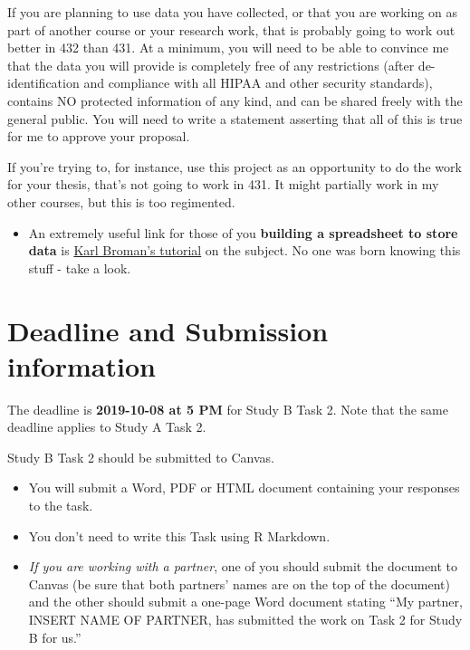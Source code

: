 \documentclass[]{book}
\providecommand{\tightlist}{%
  \setlength{\itemsep}{0pt}\setlength{\parskip}{0pt}}
\begin{document}
If you are planning to use data you have collected, or that you are working on as part of another course or your research work, that is probably going to work out better in 432 than 431. At a minimum, you will need to be able to convince me that the data you will provide is completely free of any restrictions (after de-identification and compliance with all HIPAA and other security standards), contains NO protected information of any kind, and can be shared freely with the general public. You will need to write a statement asserting that all of this is true for me to approve your proposal.

If you're trying to, for instance, use this project as an opportunity to do the work for your thesis, that's not going to work in 431. It might partially work in my other courses, but this is too regimented.

\begin{itemize}
\tightlist
\item
  An extremely useful link for those of you \textbf{building a spreadsheet to store data} is \href{http://kbroman.org/dataorg/}{Karl Broman's tutorial} on the subject. No one was born knowing this stuff - take a look.
\end{itemize}

\hypertarget{deadline-and-submission-information-2}{%
\section{Deadline and Submission information}\label{deadline-and-submission-information-2}}

The deadline is \textbf{2019-10-08 at 5 PM} for Study B Task 2. Note that the same deadline applies to Study A Task 2.

Study B Task 2 should be submitted to Canvas.

\begin{itemize}
\item
  You will submit a Word, PDF or HTML document containing your responses to the task.
\item
  You don't need to write this Task using R Markdown.
\item
  \emph{If you are working with a partner}, one of you should submit the document to Canvas (be sure that both partners' names are on the top of the document) and the other should submit a one-page Word document stating ``My partner, INSERT NAME OF PARTNER, has submitted the work on Task 2 for Study B for us.''
\end{itemize}
\end{document}
